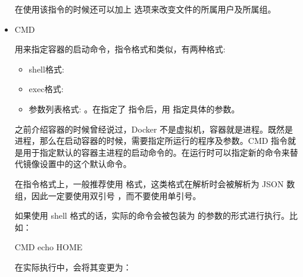 \documentclass[letterpaper,10pt,english]{sphinxmanual}
\begin{document}
\begin{itemize}
在使用该指令的时候还可以加上  选项来改变文件的所属用户及所属组。

\item {} 
CMD

用来指定容器的启动命令，指令格式和类似，有两种格式:
\begin{itemize}
\item {} 
shell格式: 

\item {} 
exec格式: 

\item {} 
参数列表格式: 。在指定了  指令后，用 指定具体的参数。

\end{itemize}

之前介绍容器的时候曾经说过，Docker 不是虚拟机，容器就是进程。既然是进程，那么在启动容器的时候，需要指定所运行的程序及参数。CMD 指令就是用于指定默认的容器主进程的启动命令的。在运行时可以指定新的命令来替代镜像设置中的这个默认命令。

在指令格式上，一般推荐使用  格式，这类格式在解析时会被解析为 JSON 数组，因此一定要使用双引号 ，而不要使用单引号。

如果使用 shell 格式的话，实际的命令会被包装为  的参数的形式进行执行。比如：

\begin{sphinxVerbatim}[commandchars=\\\{\}]
CMD echo \PYGZdl{}HOME
\end{sphinxVerbatim}

在实际执行中，会将其变更为：

\begin{sphinxVerbatim}[commandchars=\\\{\}]
 \PYG{p}{[}    \PYG{p}{]}
\end{sphinxVerbatim}


\end{itemize}
\end{document}
